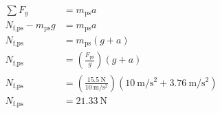 \documentclass{article}
\begin{document}
\begin{enumerate}[label=\textbf{(\alph*)}]
\begin{tikzpicture}
		\end{tikzpicture}
		\begin{align*}
			\sum F_y & = m_\text{ps}a \\
			N_\text{f,ps} - m_\text{ps}g & = m_\text{ps}a \\
			N_\text{f,ps} & = m_\text{ps}(g + a) \\
			N_\text{f,ps} & = \left( \frac{F_\text{ps}}{g} \right)(g + a) \\
			N_\text{f,ps} & = \left( \frac{\SI{15.5}{\newton}}{\SI{10}{\meter \per \second \squared}} \right) (\SI{10}{\meter \per \second \squared} + \SI{3.76}{\meter \per \second \squared}) \\
			N_\text{f,ps} & = \SI{21.33}{\newton}
		\end{align*}
\end{enumerate}
\end{document}
